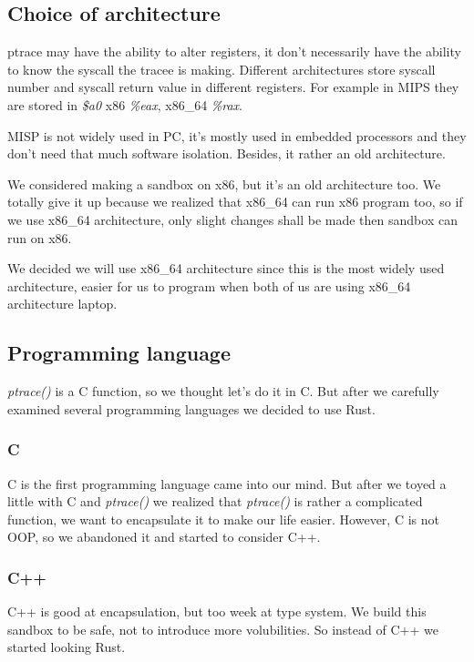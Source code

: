 \documentclass[conference,compsoc]{IEEEtran}
\begin{document}
	\subsection{Choice of architecture}
		\par
			ptrace may have the ability to alter registers, it don't necessarily have the ability to know the syscall the tracee is making. 
			Different architectures store syscall number and syscall return value in different registers. 
			For example in MIPS they are stored in \emph{\$a0} x86 \emph{\%eax}, x86\_64 \emph{\%rax}.
		\par
			MISP is not widely used in PC, it's mostly used in embedded processors and they don't need that much software isolation. 
			Besides, it rather an old architecture.
		\par 
			We considered making a sandbox on x86, but it's an old architecture too. 
			We totally give it up because we realized that x86\_64 can run x86 program too, so if we use x86\_64 architecture, only slight changes shall be made then sandbox can run on x86.
		\par 
			We decided we will use x86\_64 architecture since this is the most widely used architecture, easier for us to program when both of us are using x86\_64 architecture laptop.

	\subsection{Programming language}

		\par 
			\emph{ptrace()} is a C function, so we thought let's do it in C. 
			But after we carefully examined several programming languages we decided to use Rust.
		\subsubsection{C}
			\par
				C is the first programming language came into our mind. 
				But after we toyed a little with C and \emph{ptrace()} we realized that \emph{ptrace()} is rather a complicated function, we want to encapsulate it to make our life easier. 
				However, C is not OOP, so we abandoned it and started to consider C++.
		\subsubsection{C++}
			\par
				C++ is good at encapsulation, but too week at type system. 
				We build this sandbox to be safe, not to introduce more volubilities. 
				So instead of C++ we started looking Rust.
\end{document}
